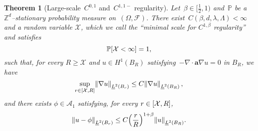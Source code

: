 \documentclass[11pt]{article} %
\numberwithin{equation}{section}
\newtheorem{theorem}{Theorem}[section]
\theoremstyle{definition}
\let\originalleft\left
\let\originalright\right
\renewcommand{\left}{\mathopen{}\mathclose\bgroup\originalleft}
\renewcommand{\right}{\aftergroup\egroup\originalright}
\newcommand*{\Zd}{\ensuremath{\mathbb{Z}^d}}
\renewcommand{\a}{\mathbf{a}}
\newcommand{\F}{\mathcal{F}}
\renewcommand{\P}{\mathbb{P}}
\newcommand{\X}{\mathcal{X}}
\newcommand{\A}{\mathcal{A}}
\begin{document}
\begin{theorem}[Large-scale~$C^{0,1}$ and~$C^{1,1-}$ regularity]
\label{t.C11.sharp}
Let~$\beta \in [\tfrac12,1)$ and~$\P$ be a~$\Zd$--stationary probability measure on~$(\Omega,\F)$. There exist~$C(\beta,d,\lambda,\Lambda)<\infty$ and a random variable $\X$, which we call the ``minimal scale for $C^{1,\beta}$ regularity'' and satisfies
\begin{equation}
\label{e.X.qual.sec2}
\P \left[ \X < \infty \right] = 1,
\end{equation}
such that, for every $R\geq \X$ and $u\in H^1(B_R)$ satisfying~$-\nabla \cdot \a\nabla u = 0$ in $B_R$, we have 
\begin{equation}
\label{e.C01}
\sup_{r \in [\X,R]}
\left\| \nabla u \right\|_{\underline{L}^2(B_r)} 
\leq C \left\| \nabla u  \right\|_{\underline{L}^2(B_R)}
\,,
\end{equation}
and there exists $\phi \in \A_1$ satisfying, for every $r \in \left[ \X,  R \right]$, 
\begin{equation}
\label{e.intrinsicreg11-}
\left\| u - \phi \right\|_{\underline{L}^2(B_r)} \leq C \left( \frac r R \right)^{1+\beta} 
\left\| u  \right\|_{\underline{L}^2(B_R)}.
\end{equation}
\end{theorem}
\end{document}
